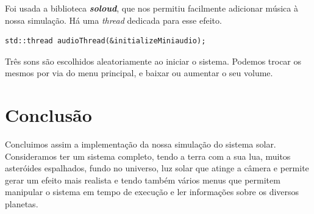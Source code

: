 \noindent
Foi usada a biblioteca \textbf{\textit{soloud}}, que nos permitiu facilmente adicionar música à nossa simulação. Há uma \textit{thread} dedicada para esse efeito.

\begin{lstlisting}[style=Cpp, caption=\textit{Thread} da Música]
std::thread audioThread(&initializeMiniaudio);
\end{lstlisting}

\noindent
Três sons são escolhidos aleatoriamente ao iniciar o sistema. Podemos trocar os mesmos por via do menu principal, e baixar ou aumentar o seu volume.

\newpage
\section{Conclusão}
\label{chap2:sec:concs}

\noindent
Concluimos assim a implementação da nossa simulação do sistema solar. Consideramos ter um sistema completo, tendo a terra com a sua lua, muitos asteróides espalhados, fundo no universo, luz solar que atinge a câmera e permite gerar um efeito mais realista e tendo também vários menus que permitem manipular o sistema em tempo de execução e ler informações sobre os diversos planetas.
